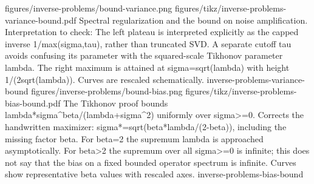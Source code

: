 {figures/inverse-problems/bound-variance.png}
{figures/tikz/inverse-problems-variance-bound.pdf}
{Spectral regularization and the bound on noise amplification.}
{Interpretation to check: The left plateau is interpreted explicitly as the capped inverse 1/max(sigma,tau), rather than truncated SVD. A separate cutoff tau avoids confusing its parameter with the squared-scale Tikhonov parameter lambda. The right maximum is attained at sigma=sqrt(lambda) with height 1/(2sqrt(lambda)). Curves are rescaled schematically.}
{inverse-problems-variance-bound}
{figures/inverse-problems/bound-bias.png}
{figures/tikz/inverse-problems-bias-bound.pdf}
{The Tikhonov proof bounds lambda*sigma\textasciicircum{}beta/(lambda+sigma\textasciicircum{}2) uniformly over sigma>=0.}
{Corrects the handwritten maximizer: sigma*=sqrt(beta*lambda/(2-beta)), including the missing factor beta. For beta=2 the supremum lambda is approached asymptotically. For beta>2 the supremum over all sigma>=0 is infinite; this does not say that the bias on a fixed bounded operator spectrum is infinite. Curves show representative beta values with rescaled axes.}
{inverse-problems-bias-bound}
